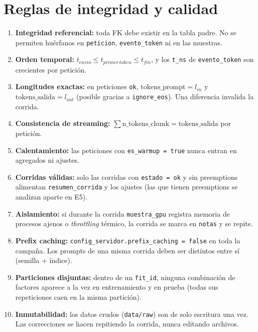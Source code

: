 \documentclass[11pt,a4paper]{article}
\begin{document}
\section{Reglas de integridad y calidad}
\begin{enumerate}[label=\textbf{R\arabic*.}, leftmargin=*]
  \item \textbf{Integridad referencial:} toda FK debe existir en la tabla padre. No se permiten huérfanos en \texttt{peticion}, \texttt{evento_token} ni en las muestras.
  \item \textbf{Orden temporal:} $t_{envio} \le t_{primer\,token} \le t_{fin}$, y los \texttt{t_ns} de \texttt{evento_token} son crecientes por petición.
  \item \textbf{Longitudes exactas:} en peticiones \texttt{ok}, $\text{tokens\_prompt} = l_{in}$ y $\text{tokens\_salida} = l_{out}$ (posible gracias a \texttt{ignore_eos}). Una diferencia invalida la corrida.
  \item \textbf{Consistencia de streaming:} $\sum \text{n\_tokens\_chunk} = \text{tokens\_salida}$ por petición.
  \item \textbf{Calentamiento:} las peticiones con \texttt{es_warmup = true} nunca entran en agregados ni ajustes.
  \item \textbf{Corridas válidas:} solo las corridas con \texttt{estado = ok} y sin preemptions alimentan \texttt{resumen_corrida} y los ajustes (las que tienen preemptions se analizan aparte en E5).
  \item \textbf{Aislamiento:} si durante la corrida \texttt{muestra_gpu} registra memoria de procesos ajenos o \emph{throttling} térmico, la corrida se marca en \texttt{notas} y se repite.
  \item \textbf{Prefix caching:} \texttt{config_servidor.prefix_caching = false} en toda la campaña. Los prompts de una misma corrida deben ser distintos entre sí (semilla + índice).
  \item \textbf{Particiones disjuntas:} dentro de un \texttt{fit_id}, ninguna combinación de factores aparece a la vez en entrenamiento y en prueba (todas sus repeticiones caen en la misma partición).
  \item \textbf{Inmutabilidad:} los datos crudos (\texttt{data/raw}) son de solo escritura una vez. Las correcciones se hacen repitiendo la corrida, nunca editando archivos.
\end{enumerate}

\end{document}

